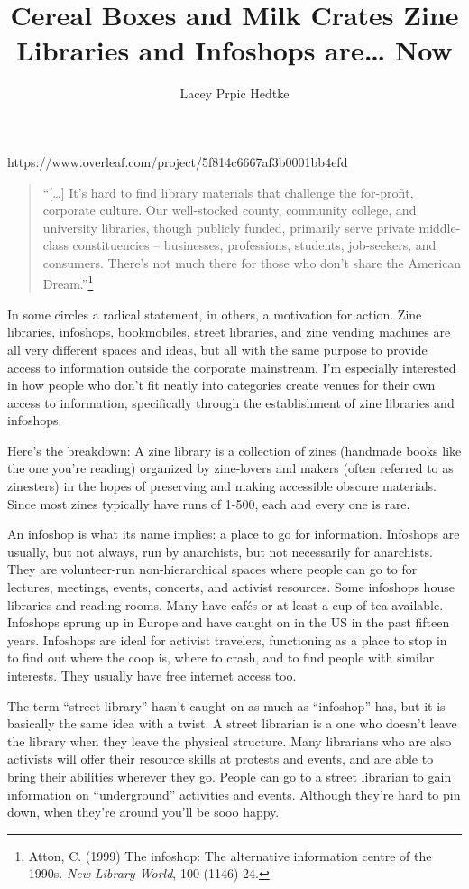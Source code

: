 \documentclass[output=paper]{langscibook}
\title{Cereal Boxes and Milk Crates Zine Libraries and Infoshops are… Now
}
\author{Lacey Prpic Hedtke}
\begin{document}
\maketitle
https://www.overleaf.com/project/5f814c6667af3b0001bb4efd
\begin{quote}
\enquote{{[}\ldots{]} It's hard to find library materials that challenge
the for-profit, corporate culture. Our well-stocked county, community
college, and university libraries, though publicly funded, primarily
serve private middle-class constituencies -- businesses, professions,
students, job-seekers, and consumers. There's not much there for those
who don't share the American Dream.}\footnote{Atton, C. (1999) The
  infoshop: The alternative information centre of the 1990s. \emph{New
  Library World}, 100 (1146) 24.}
\end{quote}

In some circles a radical statement, in others, a motivation for action.
Zine libraries, infoshops, bookmobiles, street libraries, and zine
vending machines are all very different spaces and ideas, but all with
the same purpose to provide access to information outside the corporate
mainstream. I'm especially interested in how people who don't fit neatly
into categories create venues for their own access to information,
specifically through the establishment of zine libraries and infoshops.

Here's the breakdown: A zine library is a collection of zines (handmade
books like the one you're reading) organized by zine-lovers and makers
(often referred to as zinesters) in the hopes of preserving and making
accessible obscure materials. Since most zines typically have runs of
1-500, each and every one is rare.

An infoshop is what its name implies: a place to go for information.
Infoshops are usually, but not always, run by anarchists, but not
necessarily for anarchists. They are volunteer-run non-hierarchical
spaces where people can go to for lectures, meetings, events, concerts,
and activist resources. Some infoshops house libraries and reading
rooms. Many have cafés or at least a cup of tea available. Infoshops
sprung up in Europe and have caught on in the US in the past fifteen
years. Infoshops are ideal for activist travelers, functioning as a
place to stop in to find out where the coop is, where to crash, and to
find people with similar interests. They usually have free internet
access too.

The term \enquote{street library} hasn't caught on as much as
\enquote{infoshop} has, but it is basically the same idea with a twist.
A street librarian is a one who doesn't leave the library when they
leave the physical structure. Many librarians who are also activists
will offer their resource skills at protests and events, and are able to
bring their abilities wherever they go. People can go to a street
librarian to gain information on \enquote{underground} activities and
events. Although they're hard to pin down, when they're around you'll be
sooo happy.
\end{document}
